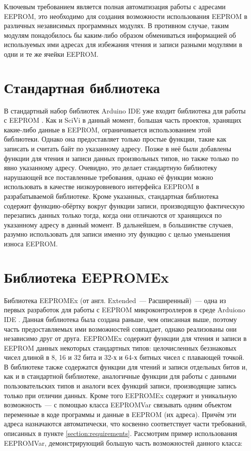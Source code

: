 Ключевым требованием является полная автоматизация работы с адресами EEPROM, это необходимо для создания возможности использования EEPROM в различных независимых программных модулях.
В противном случае, таким модулям понадобилось бы каким-либо образом обмениваться информацией об используемых ими адресах для избежания чтения и записи разными модулями в одни и те же ячейки EEPROM.


\section{Стандартная библиотека}

В стандартный набор библиотек Arduino IDE уже входит библиотека для работы с EEPROM \cite{web:arduino-eeprom}.
Как и SciVi в данный момент, большая часть проектов, хранящих какие-либо данные в EEPROM, ограничивается использованием этой библиотеки.
Однако она предоставляет только простые функции, такие как записать и считать байт по указанному адресу.
Позже в неё были добавлены функции для чтения и записи данных произвольных типов, но также только по явно указанному адресу.
Очевидно, это делает стандартную библиотеку нарушающей все поставленные требования, однако её функции можно использовать в качестве низкоуровневого интерфейса EEPROM в разрабатываемой библиотеке.
Кроме указанных, стандартная библиотека содержит функцию-обёртку вокруг функции записи, производящую фактическую перезапись данных только тогда, когда они отличаются от хранящихся по указанному адресу в данный момент.
В дальнейшем, в большинстве случаев, разумно использовать для записи именно эту функцию с целью уменьшения износа EEPROM.


\section{Библиотека EEPROMEx}

Библиотека EEPROMEx (от англ. Extended~--- Расширенный)~--- одна из первых разработок для работы с EEPROM микроконтроллеров в среде Arduiono IDE \cite{web:eepromex}.
Данная библиотека была создана раньше, чем описанная выше, поэтому часть предоставляемых ими возможностей совпадает, однако реализованы они независимо друг от друга.
EEPROMEx содержит функции для чтения и записи в EEPROM данных некоторых стандартных типов: целочисленных беззнаковых чисел длиной в 8, 16 и 32 бита и 32-х и 64-х битных чисел с плавающей точкой.
В библиотеке также содержатся функции для чтений и записи отдельных битов и, как и в стандартной библиотеке, аналогичные функции для работы с данными пользовательских типов и аналоги всех функций записи, производящие запись только при отличии данных.
Кроме того EEPROMEx содержит и уникальную возможность~--- с помощью класса EEPROMVar связывать одним объектом переменные в коде программы и данные в EEPROM (их адреса).
Причём эти адреса назначаются автоматически, что косвенно соответствует части требований, описанных в пункте \ref{section:requirements}.
Рассмотрим пример использования EEPROMVar, демонстрирующий большую часть возможностей данного класса:

